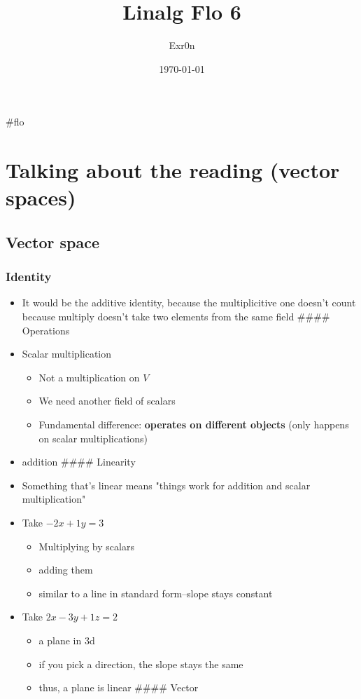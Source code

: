 \documentclass[letterpaper]{article}
\author{Exr0n}
\date{\today}
\title{Linalg Flo 6}
\renewcommand{\tableofcontents}{}
\begin{document}
\tableofcontents

\#flo

\section{Talking about the reading (vector spaces)}
\label{sec:org7bad631}
\subsection{Vector space}
\label{sec:orgabb05ea}
\subsubsection{Identity}
\label{sec:org64d246e}
\begin{itemize}
\item It would be the additive identity, because the multiplicitive one
doesn't count because multiply doesn't take two elements from the same
field \#\#\#\# Operations
\item Scalar multiplication

\begin{itemize}
\item Not a multiplication on \(V\)
\item We need another field of scalars
\item Fundamental difference: \textbf{operates on different objects} (only
happens on scalar multiplications)
\end{itemize}

\item addition \#\#\#\# Linearity
\item Something that's linear means "things work for addition and scalar
multiplication"
\item Take \(-2x+1y=3\)

\begin{itemize}
\item Multiplying by scalars
\item adding them
\item similar to a line in standard form--slope stays constant
\end{itemize}

\item Take \(2x-3y+1z=2\)

\begin{itemize}
\item a plane in 3d
\item if you pick a direction, the slope stays the same
\item thus, a plane is linear \#\#\#\# Vector
\end{itemize}


\end{itemize}
\end{document}
